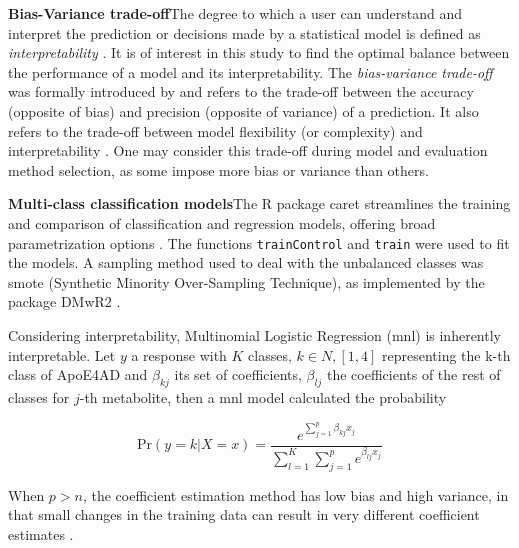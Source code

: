 \documentclass{amsart}
\begin{document}
\leavevmode\newline \textbf{Bias-Variance trade-off}\hspace{.25cm}The degree to which a user can understand and interpret the prediction or decisions made by a statistical model is defined as \textit{interpretability} \cite{Elshawi2019OnHypertension}. It is of interest in this study to find the optimal balance between the performance of a model and its interpretability. The \textit{bias-variance trade-off} was formally introduced by \citeauthor{Geman1992NeuralDilemma} and refers to the trade-off between the accuracy (opposite of bias) and precision (opposite of variance) of a prediction. It also refers to the trade-off between model flexibility (or complexity) and interpretability \cite{Geman1992NeuralDilemma}. One may consider this trade-off during model and evaluation method selection, as some impose more bias or variance than others.

\leavevmode\newline \textbf{Multi-class classification models}\hspace{.25cm}The R package \textsf{caret} streamlines the training and comparison of classification and regression models, offering broad parametrization options \cite{Kuhn2008BuildingPackage}. The functions \texttt{trainControl} and \texttt{train} were used to fit the models. A sampling method used to deal with the unbalanced classes was \acrshort{smote} (Synthetic Minority Over-Sampling Technique), as implemented by the package \textsf{DMwR2} \cite{DMwR2}.

Considering interpretability, Multinomial Logistic Regression (\acrshort{mnl}) is inherently interpretable. Let $y$ a response with $K$ classes, $k \in N, [1,4]$ representing the k-th class of ApoE4AD and $\beta_{kj}$ its set of coefficients,  $\beta_{lj}$ the coefficients of the rest of classes for $j$-th metabolite, then a \acrlong{mnl} model calculated the probability

\[\textrm{Pr}(y=k|X=x) =  \dfrac{e^{\sum_{j=1}^{p}\beta_{kj}x_j}}{\sum_{l=1}^{K}\sum_{j=1}^{p}e^{\beta_{lj}x_j}}\]

When $p > n$, the coefficient estimation method has low bias and high variance, in that small changes in the training data can result in very different coefficient estimates \cite{James2023AnEdition}. 
\end{document}
